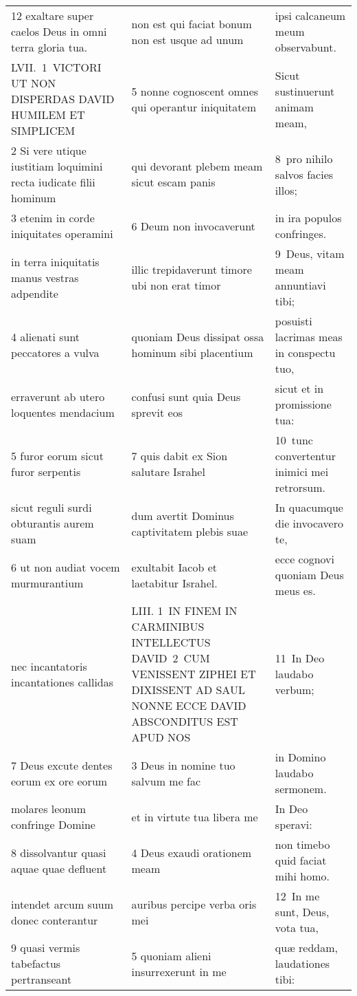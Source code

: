 \documentclass{article}
\begin{document}
\begin{longtable}{@{}p{}p{}p{}@{}}
12 exaltare super caelos Deus in omni terra gloria tua.	&	non est qui faciat bonum non est usque ad unum	&	ipsi calcaneum meum observabunt.	\\
LVII. 1 VICTORI UT NON DISPERDAS DAVID HUMILEM ET SIMPLICEM	&	5 nonne cognoscent omnes qui operantur iniquitatem	&	Sicut sustinuerunt animam meam,	\\
2 Si vere utique iustitiam loquimini recta iudicate filii hominum	&	qui devorant plebem meam sicut escam panis	&	8 pro nihilo salvos facies illos;	\\
3 etenim in corde iniquitates operamini	&	6 Deum non invocaverunt	&	in ira populos confringes.	\\
in terra iniquitatis manus vestras adpendite	&	illic trepidaverunt timore ubi non erat timor	&	9 Deus, vitam meam annuntiavi tibi;	\\
4 alienati sunt peccatores a vulva	&	quoniam Deus dissipat ossa hominum sibi placentium	&	posuisti lacrimas meas in conspectu tuo,	\\
erraverunt ab utero loquentes mendacium	&	confusi sunt quia Deus sprevit eos	&	sicut et in promissione tua:	\\
5 furor eorum sicut furor serpentis	&	7 quis dabit ex Sion salutare Israhel	&	10 tunc convertentur inimici mei retrorsum.	\\
sicut reguli surdi obturantis aurem suam	&	dum avertit Dominus captivitatem plebis suae	&	In quacumque die invocavero te,	\\
6 ut non audiat vocem murmurantium	&	exultabit Iacob et laetabitur Israhel.	&	ecce cognovi quoniam Deus meus es.	\\
nec incantatoris incantationes callidas	&	LIII. 1 IN FINEM IN CARMINIBUS INTELLECTUS DAVID 2 CUM VENISSENT ZIPHEI ET DIXISSENT AD SAUL NONNE ECCE DAVID ABSCONDITUS EST APUD NOS	&	11 In Deo laudabo verbum;	\\
7 Deus excute dentes eorum ex ore eorum	&	3 Deus in nomine tuo salvum me fac	&	in Domino laudabo sermonem.	\\
molares leonum confringe Domine	&	et in virtute tua libera me	&	In Deo speravi:	\\
8 dissolvantur quasi aquae quae defluent	&	4 Deus exaudi orationem meam	&	non timebo quid faciat mihi homo.	\\
intendet arcum suum donec conterantur	&	auribus percipe verba oris mei	&	12 In me sunt, Deus, vota tua,	\\
9 quasi vermis tabefactus pertranseant	&	5 quoniam alieni insurrexerunt in me	&	quæ reddam, laudationes tibi:	\\

\end{longtable}
\end{document}
